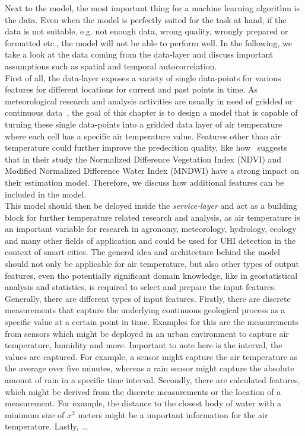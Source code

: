 Next to the model, the most important thing for a machine learning algorithm is the data. Even when the model is perfectly suited for the task at hand, if the data is not suitable, e.g. not enough data, wrong quality, wrongly prepared or formatted etc., the model will not be able to perform well. In the following, we take a look at the data coming from the data-layer and discuss important assumptions such as spatial and temporal autocorrelation.\\
First of all, the data-layer exposes a variety of single data-points for various features for different locations for current and past points in time. As meteorological research and analysis activities are usually in need of gridded or continuous data~\cite{sekulic2020spatio}, the goal of this chapter is to design a model that is capable of turning these single data-points into a gridded data layer of air temperature where each cell has a specific air temperature value. Features other than air temperature could further improve the predecition quality, like how~\cite{alonso2020new} suggests that in their study the Normalized Difference Vegetation Index (NDVI) and Modified Normalized Difference Water Index (MNDWI) have a strong impact on their estimation model. Therefore, we discuss how additional features can be included in the model.\\
This model should then be deloyed inside the \textit{service-layer} and act as a building block for further temperature related research and analysis, as air temperature is an important variable for research in agronomy, meteorology, hydrology, ecology and many other fields of application and could be used for UHI detection in the context of smart cities. The general idea and architecture behind the model should not only be applicable for air temperature, but also other types of output features, even tho potentially significant domain knowledge, like in geostatistical analysis and statistics, is required to select and prepare the input features.\\
Generally, there are different types of input features. Firstly, there are discrete measurements that capture the underlying continuous geological process as a specific value at a certain point in time. Examples for this are the measurements from sensors which might be deployed in an urban environment to capture air temperature, humidity and more. Important to note here is the interval, the values are captured. For example, a sensor might capture the air temperature as the average over five minutes, whereas a rain sensor might capture the absolute amount of rain in a specific time interval. Secondly, there are calculated features, which might be derived from the discrete measurements or the location of a measurement. For example, the distance to the closest body of water with a minimum size of $x^2$ meters might be a important information for the air temperature. Lastly, ...

